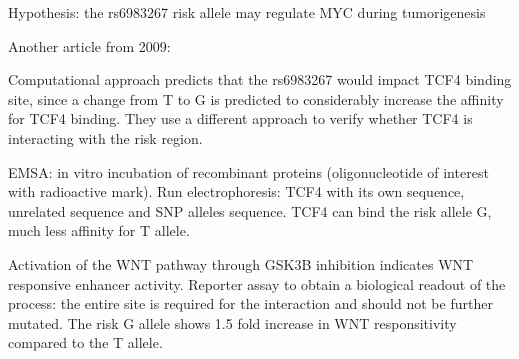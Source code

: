 Hypothesis: the rs6983267 risk allele may regulate MYC during tumorigenesis

Another article from 2009:

Computational approach predicts that the rs6983267 would impact TCF4 binding site, since a change from T to G is predicted to considerably increase the affinity for TCF4 binding. They use a different approach to verify whether TCF4 is interacting with the risk region.

EMSA: in vitro incubation of recombinant proteins (oligonucleotide of interest with radioactive mark). Run electrophoresis: TCF4 with its own sequence, unrelated sequence and SNP alleles sequence. TCF4 can bind the risk allele G, much less affinity for T allele.

Activation of the WNT pathway through GSK3B inhibition indicates WNT responsive enhancer activity. Reporter assay to obtain a biological readout of the process: the entire site is required for the interaction and should not be further mutated. The risk G allele shows 1.5 fold increase in WNT responsitivity compared to the T allele.
